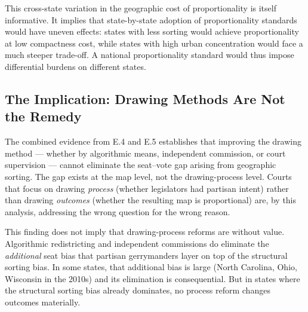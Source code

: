 This cross-state variation in the geographic cost of proportionality is itself
informative.  It implies that state-by-state adoption of proportionality
standards would have uneven effects: states with less sorting would achieve
proportionality at low compactness cost, while states with high urban
concentration would face a much steeper trade-off.  A national proportionality
standard would thus impose differential burdens on different states.

\subsection{The Implication: Drawing Methods Are Not the Remedy}

The combined evidence from E.4 and E.5 establishes that improving the drawing
method --- whether by algorithmic means, independent commission, or court
supervision --- cannot eliminate the seat--vote gap arising from geographic
sorting.  The gap exists at the map level, not the drawing-process level.
Courts that focus on drawing \emph{process} (whether legislators had partisan
intent) rather than drawing \emph{outcomes} (whether the resulting map is
proportional) are, by this analysis, addressing the wrong question for the
wrong reason.

This finding does not imply that drawing-process reforms are without value.
Algorithmic redistricting and independent commissions do eliminate the
\emph{additional} seat bias that partisan gerrymanders layer on top of the
structural sorting bias.  In some states, that additional bias is large
(North Carolina, Ohio, Wisconsin in the 2010s) and its elimination is
consequential.  But in states where the structural sorting bias already
dominates, no process reform changes outcomes materially.
